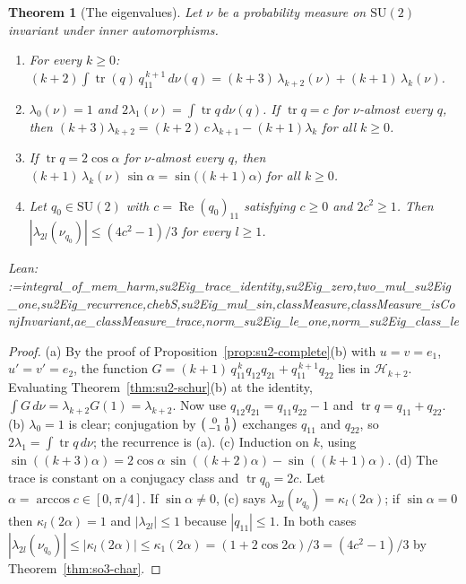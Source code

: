 \documentclass[11pt]{amsart}
\makeatletter
\newtheorem{theorem}{Theorem}[section]
\theoremstyle{definition}
\theoremstyle{remark}
\newcommand{\@leanlist}[1]{\def\@leansep{}\@for\@leanname:=#1\do{\@leansep
  \texttt{\expandafter\detokenize\expandafter{\@leanname}}\def\@leansep{, }}}
\newcommand{\lean}[1]{\par\smallskip\noindent
  {\footnotesize\normalfont\raggedright\textsf{Lean:} \@leanlist{#1}\par}}
\newcommand{\tr}{\operatorname{tr}}
\newcommand{\re}{\operatorname{Re}}
\makeatother
\begin{document}
\begin{theorem}[The eigenvalues]\label{thm:su2-weyl}
Let $\nu$ be a probability measure on $\mathrm{SU}(2)$ invariant under inner automorphisms.
\begin{enumerate}
\item[(a)] For every $k\ge0$:
$(k+2)\displaystyle\int\tr(q)\,q_{11}^{\,k+1}\,d\nu(q)=(k+3)\,\lambda_{k+2}(\nu)+(k+1)\,\lambda_k(\nu)$.
\item[(b)] $\lambda_0(\nu)=1$ and $2\lambda_1(\nu)=\int\tr q\,d\nu(q)$.  If $\tr q=c$ for
$\nu$-almost every $q$, then
$(k+3)\lambda_{k+2}=(k+2)\,c\,\lambda_{k+1}-(k+1)\lambda_k$ for all $k\ge0$.
\item[(c)] If $\tr q=2\cos\alpha$ for $\nu$-almost every $q$, then
$(k+1)\,\lambda_k(\nu)\,\sin\alpha=\sin\bigl((k+1)\alpha\bigr)$ for all $k\ge0$.
\item[(d)] Let $q_0\in\mathrm{SU}(2)$ with $c=\re(q_0)_{11}$ satisfying $c\ge0$ and $2c^2\ge1$.
Then $|\lambda_{2l}(\nu_{q_0})|\le(4c^2-1)/3$ for every $l\ge1$.
\end{enumerate}
\lean{integral_of_mem_harm,su2Eig_trace_identity,su2Eig_zero,two_mul_su2Eig_one,su2Eig_recurrence,chebS,su2Eig_mul_sin,classMeasure,classMeasure_isConjInvariant,ae_classMeasure_trace,norm_su2Eig_le_one,norm_su2Eig_class_le}
\end{theorem}

\begin{proof}
(a) By the proof of Proposition~\ref{prop:su2-complete}(b) with $u=v=e_1$, $u'=v'=e_2$, the
function $G=(k+1)\,q_{11}^{\,k}q_{12}q_{21}+q_{11}^{\,k+1}q_{22}$ lies in $\mathcal H_{k+2}$.
Evaluating Theorem~\ref{thm:su2-schur}(b) at the identity, $\int G\,d\nu=\lambda_{k+2}G(1)
=\lambda_{k+2}$.  Now use $q_{12}q_{21}=q_{11}q_{22}-1$ and $\tr q=q_{11}+q_{22}$.  (b)
$\lambda_0=1$ is clear; conjugation by $\begin{psmallmatrix}0&1\\-1&0\end{psmallmatrix}$
exchanges $q_{11}$ and $q_{22}$, so $2\lambda_1=\int\tr q\,d\nu$; the recurrence is (a).  (c)
Induction on $k$, using $\sin((k+3)\alpha)=2\cos\alpha\,\sin((k+2)\alpha)-\sin((k+1)\alpha)$.
(d) The trace is constant on a conjugacy class and $\tr q_0=2c$.  Let
$\alpha=\arccos c\in[0,\pi/4]$.  If $\sin\alpha\ne0$, (c) says
$\lambda_{2l}(\nu_{q_0})=\kappa_l(2\alpha)$; if $\sin\alpha=0$ then $\kappa_l(2\alpha)=1$ and
$|\lambda_{2l}|\le1$ because $|q_{11}|\le1$.  In both cases
$|\lambda_{2l}(\nu_{q_0})|\le|\kappa_l(2\alpha)|\le\kappa_1(2\alpha)=(1+2\cos2\alpha)/3
=(4c^2-1)/3$ by Theorem~\ref{thm:so3-char}.
\end{proof}
\end{document}
